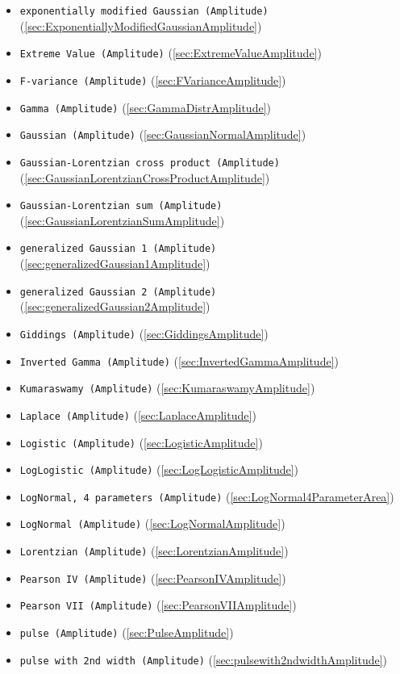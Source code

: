 \begin{itemize}
\begin{itemize}
\begin{itemize}
    \item \texttt{exponentially modified Gaussian (Amplitude)} (\ref{sec:ExponentiallyModifiedGaussianAmplitude})
    \item \texttt{Extreme Value (Amplitude)} (\ref{sec:ExtremeValueAmplitude})
    \item \texttt{F-variance (Amplitude)} (\ref{sec:FVarianceAmplitude})
    \item \texttt{Gamma (Amplitude)} (\ref{sec:GammaDistrAmplitude})
    \item \texttt{Gaussian (Amplitude)} (\ref{sec:GaussianNormalAmplitude})
    \item \texttt{Gaussian-Lorentzian cross product (Amplitude)} (\ref{sec:GaussianLorentzianCrossProductAmplitude})
    \item \texttt{Gaussian-Lorentzian sum (Amplitude)} (\ref{sec:GaussianLorentzianSumAmplitude})
    \item \texttt{generalized Gaussian 1 (Amplitude)} (\ref{sec:generalizedGaussian1Amplitude})
    \item \texttt{generalized Gaussian 2 (Amplitude)} (\ref{sec:generalizedGaussian2Amplitude})
    \item \texttt{Giddings (Amplitude)} (\ref{sec:GiddingsAmplitude})
    \item \texttt{Inverted Gamma (Amplitude)} (\ref{sec:InvertedGammaAmplitude})
    \item \texttt{Kumaraswamy (Amplitude)} (\ref{sec:KumaraswamyAmplitude})
    \item \texttt{Laplace (Amplitude)} (\ref{sec:LaplaceAmplitude})
    \item \texttt{Logistic (Amplitude)} (\ref{sec:LogisticAmplitude})
    \item \texttt{LogLogistic (Amplitude)} (\ref{sec:LogLogisticAmplitude})
    \item \texttt{LogNormal, 4 parameters (Amplitude)} (\ref{sec:LogNormal4ParameterArea})
    \item \texttt{LogNormal (Amplitude)} (\ref{sec:LogNormalAmplitude})
    \item \texttt{Lorentzian (Amplitude)} (\ref{sec:LorentzianAmplitude})
    \item \texttt{Pearson IV (Amplitude)} (\ref{sec:PearsonIVAmplitude})
    \item \texttt{Pearson VII (Amplitude)} (\ref{sec:PearsonVIIAmplitude})
    \item \texttt{pulse (Amplitude)}  (\ref{sec:PulseAmplitude})
    \item \texttt{pulse with 2nd width (Amplitude)}  (\ref{sec:pulsewith2ndwidthAmplitude})

\end{itemize}
\end{itemize}
\end{itemize}
